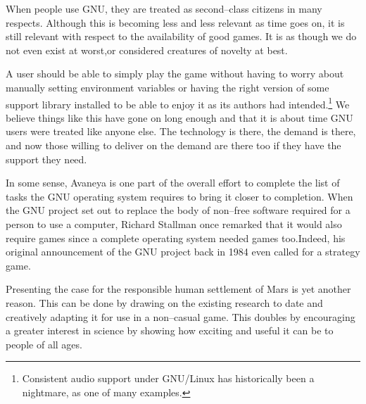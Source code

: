 When people use GNU, they are treated as second--class citizens in many respects. Although this is becoming less and less relevant as time goes on, it is still relevant with respect to the availability of good games. It is as though we do not even exist at worst, or considered creatures of novelty at best. 

A user should be able to simply play the game without having to worry about manually setting environment variables or having the right version of some support library installed to be able to enjoy it as its authors had intended.\footnote{Consistent audio support under GNU/Linux has historically been a nightmare, as one of many examples.} We believe things like this have gone on long enough and that it is about time GNU users were treated like anyone else. The technology is there, the demand is there, and now those willing to deliver on the demand are there too if they have the support they need.

In some sense, Avaneya is one part of the overall effort to complete the list of tasks the GNU operating system requires to bring it closer to completion. When the GNU project set out to replace the body of non--free software required for a person to use a computer, Richard Stallman once remarked that it would also require games since a complete operating system needed games too.  Indeed, his original announcement of the GNU project back in 1984 even called for a strategy game.

Presenting the case for the responsible human settlement of Mars is yet another reason. This can be done by drawing on the existing research to date and creatively adapting it for use in a non--casual game. This doubles by encouraging a greater interest in science by showing how exciting and useful it can be to people of all ages. 

